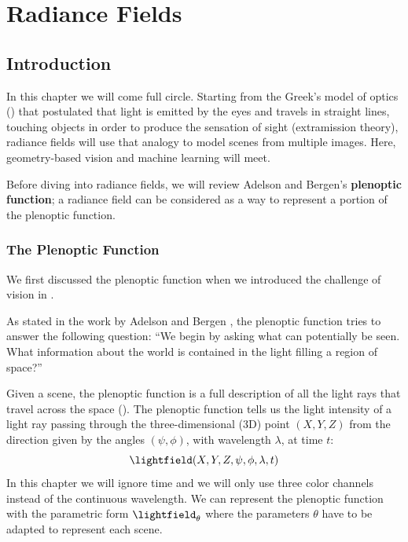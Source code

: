 
\chapter{Radiance Fields}
\label{chapter:nerfs}


\section{Introduction}


In this chapter we will come full circle. Starting from the Greek's model of optics (\chap{\ref{chap:challenge_of_vision}}) that postulated that light is emitted by the eyes and travels in straight lines, touching objects in order to produce the sensation of sight (extramission theory), radiance fields will use that analogy to model scenes from multiple images. Here, geometry-based vision and machine learning will meet.

Before diving into radiance fields, we will review Adelson and Bergen's \textbf{plenoptic function}; a radiance field can be considered as a way to represent a portion of the plenoptic function.%

\subsection{The Plenoptic Function}

We first discussed the plenoptic function when we introduced the challenge of vision in \chap{\ref{chap:challenge_of_vision}}.

As stated in the work by Adelson and Bergen \cite{Adelson91}, the plenoptic function tries to answer the following question: ``We begin by asking what can potentially be seen. What
information about the world is contained in the light
filling a region of space?''


Given a scene, the plenoptic function is a full description of all the light rays that travel across the space (\fig{\ref{fig:nerfs:plenoptic_function}}). The plenoptic function tells us the light intensity of a light ray passing through the three-dimensional (3D) point $(X, Y, Z)$ from the direction given by the angles $(\psi, \phi)$, with wavelength $\lambda$, at time $t$:
\begin{equation}
    \lightfield (X, Y, Z, \psi, \phi, \lambda, t)
\end{equation}
In this chapter we will ignore time and we will only use three color channels instead of the continuous wavelength. We can represent the plenoptic function with the parametric form $\lightfield_{\theta}$ where the parameters $\theta$ have to be adapted to represent each scene.

